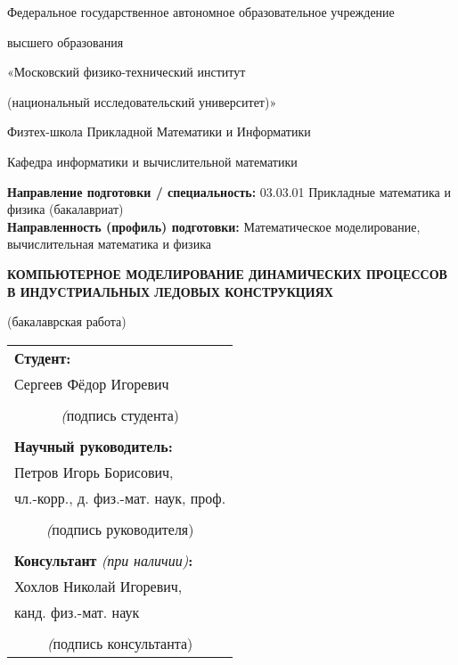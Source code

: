 \singlespacing

\begin{titlepage}
    \begin{center}
        Федеральное государственное автономное образовательное учреждение
        
        высшего образования
        
        «Московский физико-технический институт
        
        (национальный исследовательский университет)»
        
        Физтех-школа Прикладной Математики и Информатики
        
        Кафедра информатики и вычислительной математики
    \end{center}

    \begin{flushleft}
        \textbf{Направление подготовки / специальность:} 03.03.01  Прикладные математика и физика (бакалавриат)\\
        
        \textbf{Направленность (профиль) подготовки:} Математическое моделирование, вычислительная математика и физика
    \end{flushleft}

    \begin{center}
        \vspace{\fill}
        \Large \bfseries
        КОМПЬЮТЕРНОЕ МОДЕЛИРОВАНИЕ ДИНАМИЧЕСКИХ ПРОЦЕССОВ В ИНДУСТРИАЛЬНЫХ ЛЕДОВЫХ КОНСТРУКЦИЯХ \vspace{1em}
        
        \normalsize \normalfont
        (бакалаврская работа)
        \vspace{\fill}
    \end{center}

    \hfill
    \begin{tabular}{@{}l@{}}
        \textbf{Студент:} \\
        Сергеев Фёдор Игоревич \\
        \medskip\\
        \hline\multicolumn{1}{c}{{\textit (подпись студента)}}\\
        \\
        \textbf{Научный руководитель:} \\
        Петров Игорь Борисович, \\
        чл.-корр., д. физ.-мат. наук, проф.\\
        \medskip\\
        \hline\multicolumn{1}{c}{{\textit (подпись руководителя)}}\\
        \\
        \textbf{Консультант} \textit{(при наличии)}\textbf{:} \\
        Хохлов Николай Игоревич, \\
        канд. физ.-мат. наук \\
        \medskip\\
        \hline\multicolumn{1}{c}{{\textit (подпись консультанта)}}
    \end{tabular}


\end{titlepage}

